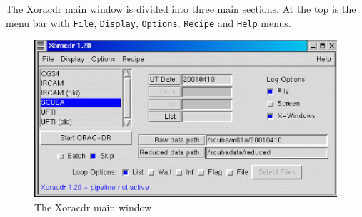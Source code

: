 \documentclass[twoside,11pt]{article}
\renewcommand{\_}{\texttt{\symbol{95}}}
\begin{document}
The Xoracdr main window is divided into three main sections. At the
top is the menu bar with \texttt{File}, \texttt{Display}, \texttt{Options}, \texttt{Recipe}
and \texttt{Help} menus.

\begin{figure}
\begin{center}
\includegraphics[width=5.0in]{sun230_xoracdr.eps}
\caption{The Xoracdr main window}
\end{center}
\end{figure}
\end{document}
